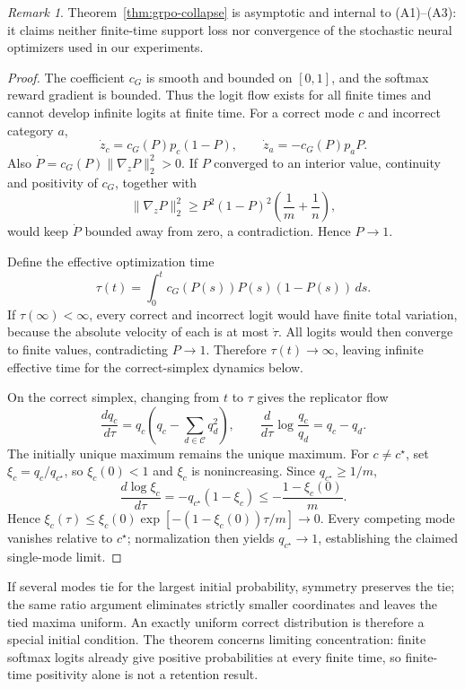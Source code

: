 \documentclass{article}
\newcommand{\1}{\mathbf 1}
\theoremstyle{remark}
\newtheorem{remark}[lemma]{Remark}
\theoremstyle{definition}
\theoremstyle{plain}
\begin{document}
\begin{remark}
Theorem~\ref{thm:grpo-collapse} is asymptotic and internal to (A1)--(A3): it
claims neither finite-time support loss nor convergence of the stochastic
neural optimizers used in our experiments.
\end{remark}

\begin{proof}
The coefficient $c_G$ is smooth and bounded on $[0,1]$, and the softmax
reward gradient is bounded. Thus the logit flow exists for all finite times
and cannot develop infinite logits at finite time.
For a correct mode $c$ and incorrect category $a$,
\[
  \dot z_c=c_G(P)p_c(1-P),
  \qquad
  \dot z_a=-c_G(P)p_aP.
\]
Also $\dot P=c_G(P)\lVert\nabla_zP\rVert_2^2>0$. If $P$ converged to an
interior value, continuity and positivity of $c_G$, together with
\[
 \lVert\nabla_zP\rVert_2^2
 \ge P^2(1-P)^2\left(\frac1m+\frac1n\right),
\]
would keep $\dot P$ bounded away from zero, a contradiction. Hence $P\to1$.

Define the effective optimization time
\[
  \tau(t)=\int_0^t c_G(P(s))P(s)(1-P(s))\,ds.
\]
If $\tau(\infty)<\infty$, every correct and incorrect logit would have finite
total variation, because the absolute velocity of each is at most $\dot\tau$.
All logits would then converge to finite values, contradicting $P\to1$.
Therefore $\tau(t)\to\infty$, leaving infinite effective time for the
correct-simplex dynamics below.

On the correct simplex, changing from $t$ to $\tau$ gives the replicator flow
\begin{equation}
  \frac{dq_c}{d\tau}
  =q_c\left(q_c-\sum_{d\in\mathcal C}q_d^2\right),
  \qquad
  \frac{d}{d\tau}\log\frac{q_c}{q_d}=q_c-q_d.
  \label{eq:grpo-replicator}
\end{equation}
The initially unique maximum remains the unique maximum. For $c\ne c^\star$,
set $\xi_c=q_c/q_{c^\star}$, so $\xi_c(0)<1$ and $\xi_c$ is nonincreasing.
Since $q_{c^\star}\ge1/m$,
\[
 \frac{d\log\xi_c}{d\tau}
 =-q_{c^\star}(1-\xi_c)
 \le-\frac{1-\xi_c(0)}{m}.
\]
Hence $\xi_c(\tau)\le\xi_c(0)\exp[-(1-\xi_c(0))\tau/m]\to0$.
Every competing mode vanishes relative to $c^\star$; normalization then
yields $q_{c^\star}\to1$, establishing the claimed single-mode limit.
\end{proof}

If several modes tie for the largest initial probability, symmetry preserves
the tie; the same ratio argument eliminates strictly smaller coordinates and
leaves the tied maxima uniform. An exactly uniform correct distribution is
therefore a special initial condition. The theorem concerns limiting
concentration: finite softmax logits already give positive probabilities at
every finite time, so finite-time positivity alone is not a retention result.
\end{document}
